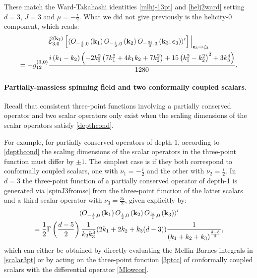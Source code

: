 \documentclass[11pt,a4paper]{article}
\begin{document}
These match the Ward-Takahashi identities \eqref{mlhj-13pt} and \eqref{helj2ward} setting $d=3$, $J=3$ and $\mu = -\tfrac{i}{2}$. What we did not give previously is the helicity-0 component, which reads:
\begin{multline}
   \widehat{\mathcal{E}}^{({\bf k}_3)}_{3,0}\left[\langle O_{-\frac{i}{2},0}\left({\bf k}_1\right)O_{-\frac{i}{2},0}\left({\bf k}_2\right)O_{-\frac{5i}{2},3}\left({\bf k}_3;\boldsymbol{\epsilon}_3\right)  \rangle^\prime\right]\Big|_{\boldsymbol{\epsilon}_3 \to \zeta_3}\\ =  -g^{\left(3,0\right)}_{12}\frac{i \left(k_1-k_2\right) \left(-2 k^2 _3\left(7 k^2_1+4 k_1k_2+7 k^2_2\right)+15 \left(k^2_1-k^2_2\right)^2+3 k^4_3\right)}{1280}.
\end{multline}
\vspace*{0.1cm}
\paragraph{Partially-massless spinning field and two conformally coupled scalars.} Recall that consistent three-point functions involving a partially conserved operator and two scalar operators only exist when the scaling dimensions of the scalar operators satisfy \eqref{depthcond}. 

For example, for partially conserved operators of depth-1, according to \eqref{depthcond} the scaling dimensions of the scalar operators in the three-point function must differ by $\pm 1$. The simplest case is if they both correspond to conformally coupled scalars, one with $\nu_1=-\frac{i}{2}$ and the other with $\nu_2=\frac{i}{2}$. In $d=3$ the three-point function of a partially conserved operator of depth-1 is generated via \eqref{spinJ3fromsc} from the three-point function of the latter scalars and a third scalar operator with ${\bar \nu}_3 = \frac{3i}{2}$, given explicitly by:
\begin{multline}\label{3ptpmseed}
    \langle O_{-\frac{i}{2},0}\left({\bf k}_1\right)O_{\frac{i}{2},0}\left({\bf k}_2\right)O_{\frac{3i}{2},0}\left({\bf k}_3\right)  \rangle^\prime \\ = \frac{1}{2} \Gamma \left(\frac{d-5}{2}\right)\frac{1}{k_2 k^3_3}  (2 k_1+2 k_2+k_3 (d-3)) \frac{1}{\left(k_1+k_2+k_3\right)^{\frac{d-3}{2}}},
\end{multline}
which can either be obtained by directly evaluating the Mellin-Barnes integrals in \eqref{scalar3pt} or by acting on the three-point function \eqref{3ptcc} of conformally coupled scalars with the differential operator \eqref{Mlowcor}. 
\end{document}
